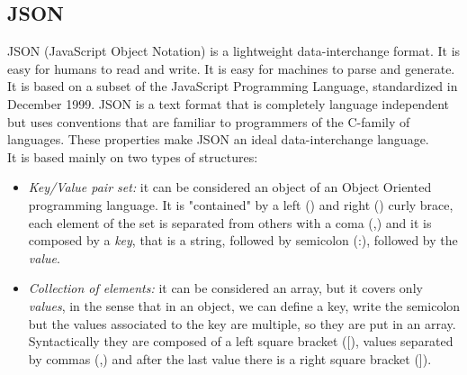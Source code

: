 \subsection{JSON} \label{json}
JSON (JavaScript Object Notation) is a lightweight data-interchange format. It is easy for humans to read and write. It is easy for machines to parse and generate. It is based on a subset of the JavaScript Programming Language, standardized in December 1999. JSON is a text format that is completely language independent but uses conventions that are familiar to programmers of the C-family of languages. These properties make JSON an ideal data-interchange language. \cite{jsondef} \\
It is based mainly on two types of structures: 

\begin{itemize}

	\item \textit{Key/Value pair set:} it can be considered an object of an Object Oriented programming language. It is "contained" by a left ({) and right (}) curly brace, each element of the set is separated from others with a coma (,) and it is composed by a \textit{key}, that is a string, followed by semicolon (:), followed by the \textit{value}.
	
	\item \textit{Collection of elements:} it can be considered an array, but it covers only \textit{values}, in the sense that in an object, we can define a key, write the semicolon but the values associated to the key are multiple, so they are put in an array. Syntactically they are composed of a left square bracket ([), values separated by commas (,) and after the last value there is a right square bracket (]).

\end{itemize}

